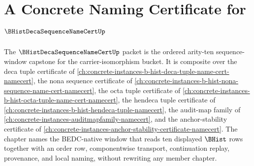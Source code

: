 \chapter{A Concrete Naming Certificate for $\BHistDecaSequenceNameCertUp$}
\label{ch:concrete-instances-b-hist-deca-sequence-name-cert-namecert}

The $\BHistDecaSequenceNameCertUp$ packet is the ordered arity-ten sequence-window capstone for the carrier-isomorphism bucket. It is composite over the deca tuple certificate of \autoref{ch:concrete-instances-b-hist-deca-tuple-name-cert-namecert}, the nona sequence certificate of \autoref{ch:concrete-instances-b-hist-nona-sequence-name-cert-namecert}, the octa tuple certificate of \autoref{ch:concrete-instances-b-hist-octa-tuple-name-cert-namecert}, the hendeca tuple certificate of \autoref{ch:concrete-instances-b-hist-hendeca-tuple-namecert}, the audit-map family of \autoref{ch:concrete-instances-auditmapfamily-namecert}, and the anchor-stability certificate of \autoref{ch:concrete-instances-anchor-stability-certificate-namecert}. The chapter names the BEDC-native window that reads ten displayed $\BHist$ rows together with an order row, componentwise transport, continuation replay, provenance, and local naming, without rewriting any member chapter.

